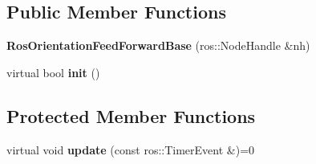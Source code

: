 \subsection*{Public Member Functions}
\begin{DoxyCompactItemize}
\item 
\mbox{\label{classRosOrientationFeedForwardBase_a78b33a8470ac0a61170bf3964af2b886}} 
{\bfseries Ros\+Orientation\+Feed\+Forward\+Base} (ros\+::\+Node\+Handle \&nh)
\item 
\mbox{\label{classRosOrientationFeedForwardBase_a272a4ee861d33ba29fa87b3d31804b60}} 
virtual bool {\bfseries init} ()
\end{DoxyCompactItemize}
\subsection*{Protected Member Functions}
\begin{DoxyCompactItemize}
\item 
\mbox{\label{classRosOrientationFeedForwardBase_aae14308591e714b2b6aa01a25ee3f426}} 
virtual void {\bfseries update} (const ros\+::\+Timer\+Event \&)=0
\end{DoxyCompactItemize}
